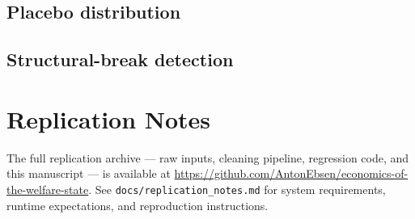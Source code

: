 \subsection{Placebo distribution}

\subsection{Structural-break detection}

\section{Replication Notes}
\label{app:replication}

The full replication archive --- raw inputs, cleaning pipeline,
regression code, and this manuscript --- is available at
\url{https://github.com/AntonEbsen/economics-of-the-welfare-state}.
See \texttt{docs/replication\_notes.md} for system requirements,
runtime expectations, and reproduction instructions.

